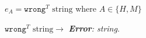 \begin{case}

$e_{A}=\mathtt{wrong}^{T}$ $\mathrm{string}$ where $A\in\lbrace H,M\rbrace$

$\mathtt{wrong}^{T}$ $\mathrm{string}\rightarrow$ \emph{\textbf{Error}: string}.

\end{case}